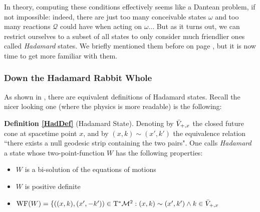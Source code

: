 \documentclass[a4paper,11pt]{article}
\numberwithin{equation}{section}
\theoremstyle{definition}
\begin{document}
In theory, computing these conditions effectively seems like a Dantean problem, if not impossible: indeed, there are just too many conceivable states $\omega$ and too many reactions $\mathcal{Q}$ could have when acting on $\omega$... But as it turns out, we can restrict ourselves to a subset of all states to only consider much friendlier ones called \emph{Hadamard} states. We briefly mentioned them before on page \pageref{FirstMentionHad}, but it is now time to get more familiar with them.
\subsubsection{Down the Hadamard Rabbit Whole} \label{DefHad}
As shown in \cite{HadEquiv}, there are equivalent definitions of Hadamard states. Recall the nicer looking one (where the physics is more readable) is the following:

\noindent \textbf{Definition \ref{HadDef}} (Hadamard State).
    Denoting by $\Bar{V}_{+,x}$ the closed future cone at spacetime point $x$, and by $(x,k)\sim(x',k')$ the equivalence relation ``there exists a null geodesic strip containing the two pairs". One calls \emph{Hadamard} a state whose two-point-function $W$ has the following properties:
    \begin{itemize}
        \item $W$ is a bi-solution of the equations of motions
        \item $W$ is positive definite
        \item $\mathrm{WF}(W)=\{ ((x,k),(x',-k'))\in \mathrm{T}^*\mathcal{M}^2 : (x,k)\sim(x',k')\wedge k \in \Bar{V}_{+,x}$
    \end{itemize}
\end{document}
